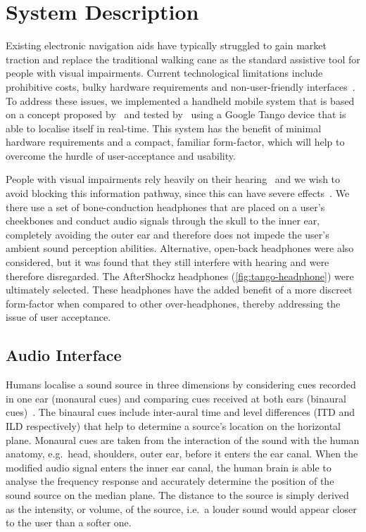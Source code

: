 \documentclass[acmsmall]{acmart}
\begin{document}
\section{System Description}\label{sec:system-description}

Existing electronic navigation aids have typically struggled to gain market traction and replace the traditional walking cane as the standard assistive tool for people with visual impairments.
Current technological limitations include prohibitive costs, bulky hardware requirements and non-user-friendly interfaces~\citep{golledge2004stated,yusif2016older,arditi2013user}.
To address these issues, we implemented a handheld mobile system that is based on a concept proposed by~\citet{lock2019active} and tested by~\citet{lock2019bone} using a Google Tango device that is able to localise itself in real-time.
This system has the benefit of minimal hardware requirements and a compact, familiar form-factor, which will help to overcome the hurdle of user-acceptance and usability.

People with visual impairments rely heavily on their hearing~\citep{golledge2004stated} and we wish to avoid blocking this information pathway, since this can have severe effects~\citep{lichtenstein2012headphone}.
We there use a set of bone-conduction headphones that are placed on a user's cheekbones and conduct audio signals through the skull to the inner ear, completely avoiding the outer ear and therefore does not impede the user's ambient sound perception abilities. 
Alternative, open-back headphones were also considered, but it was found that they still interfere with hearing and were therefore disregarded.
The AfterShockz headphones (\cref{fig:tango-headphone}) were ultimately selected.
These headphones have the added benefit of a more discreet form-factor when compared to other over-headphones, thereby addressing the issue of user acceptance. 

\subsection{Audio Interface}

Humans localise a sound source in three dimensions by considering cues recorded in one ear (monaural cues) and comparing cues received at both ears (binaural cues)~\citep{blauert1997spatial,blauert1969sound}.
The binaural cues include inter-aural time and level differences (ITD and ILD respectively) that help to determine a source's location on the horizontal plane.
Monaural cues are taken from the interaction of the sound with the human anatomy, e.g.\ head, shoulders, outer ear, before it enters the ear canal.
When the modified audio signal enters the inner ear canal, the human brain is able to analyse the frequency response and accurately determine the position of the sound source on the median plane. 
The distance to the source is simply derived as the intensity, or volume, of the source, i.e.\ a louder sound would appear closer to the user than a softer one. 
\end{document}
